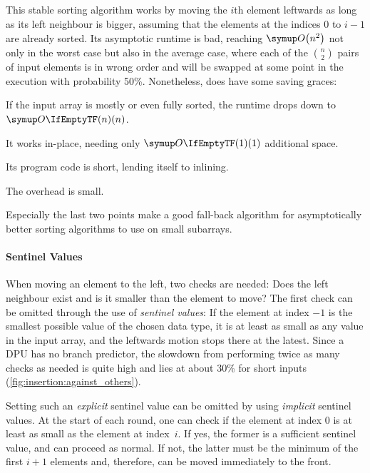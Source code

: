 \subsection{\texorpdfstring{\IS{}}{InsertionSort}}
\label{subsec:tasklet:insertion}

This stable sorting algorithm works by moving the \(i\)th element leftwards as long as its left neighbour is bigger, assuming that the elements at the indices \(0\) to \(i - 1\) are already sorted.
Its asymptotic runtime is bad, reaching \(\bigoh*{n^2}\) not only in the worst case but also in the average case, where each of the \(\binom{n}{2}\) pairs of input elements is in wrong order and will be swapped at some point in the execution with probability 50\%.
Nonetheless, \IS{} does have some saving graces:
\begin{enumerate*}
	\item
	If the input array is mostly or even fully sorted, the runtime drops down to \(\bigoh{n}\).

	\item
	It works in-place, needing only \(\bigoh{1}\) additional space.

	\item
	Its program code is short, lending itself to inlining.

	\item
	The overhead is small.
\end{enumerate*}
Especially the last two points make \IS{} a good fall-back algorithm for asymptotically better sorting algorithms to use on small subarrays.

\paragraph{Sentinel Values}
When moving an element to the left, two checks are needed:
Does the left neighbour exist and is it smaller than the element to move?
The first check can be omitted through the use of \emph{sentinel values}:
If the element at index \(-1\) is the smallest possible value of the chosen data type, it is at least as small as any value in the input array, and the leftwards motion stops there at the latest.
Since a DPU has no branch predictor, the slowdown from performing twice as many checks as needed is quite high and lies at about 30\% for short inputs (\cref{fig:insertion:against_others}).

Setting such an \emph{explicit} sentinel value can be omitted by using \emph{implicit} sentinel values.
At the start of each round, one can check if the element at index \(0\) is at least as small as the element at index~\(i\).
If yes, the former is a sufficient sentinel value, and \IS{} can proceed as normal.
If not, the latter must be the minimum of the first \(i + 1\) elements and, therefore, can be moved immediately to the front.

